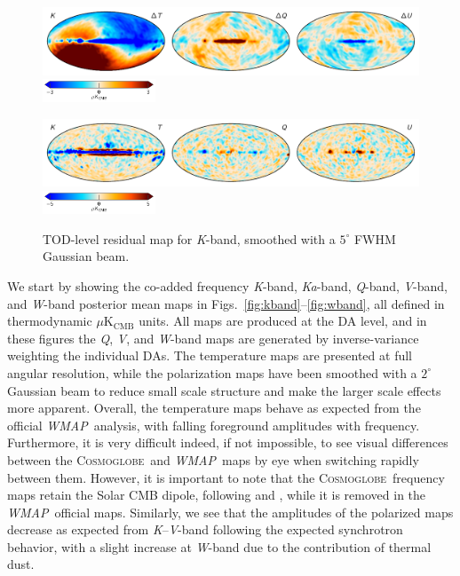 \documentclass[twocolumn]{../../common/aa}
\def\WMAP{\emph{WMAP}}
\def\WMAPnine{\emph{WMAP9}}
\newcommand{\cosmoglobe}{\textsc{Cosmoglobe}}
\newcommand{\K}[0]{\textit K}
\newcommand{\Ka}[0]{\textit{Ka}}
\newcommand{\Q}[0]{\textit Q}
\newcommand{\V}[0]{\textit V}
\newcommand{\W}[0]{\textit W}
\begin{document}
\begin{figure}[t]
	\centering
	\includegraphics[width=\textwidth]{figures/023-WMAP_K_sampdiff.pdf}\\
	\includegraphics[width=0.30\textwidth]{figures/cbar_3uK.pdf}        
	\caption{Difference between two \K-band Gibbs samples, smoothed to $7^\circ$.}
        \label{fig:Ksampdiff}

	\centering
	\includegraphics[width=\textwidth]{figures/tod_res_K_IQU.pdf}\\
	\includegraphics[width=0.30\textwidth]{figures/cbar_5uK.pdf}
	\caption{TOD-level residual map for \K-band, smoothed with a $5^\circ$ FWHM Gaussian beam.}
        \label{fig:todres_K}
\end{figure}

We start by showing the co-added frequency \K-band, \Ka-band, \Q-band, \V-band, and \W-band posterior mean maps in Figs.~\ref{fig:kband}--\ref{fig:wband}, all defined in thermodynamic  $\mu\mathrm{K_{CMB}}$ units. All maps are produced at the DA level, and in these figures the \Q, \V, and \W-band maps are generated by inverse-variance weighting the individual DAs. The temperature maps are presented at full angular resolution, while the polarization maps have been smoothed with a $2^\circ$ Gaussian beam to reduce small scale structure and make the larger scale effects more apparent. Overall, the temperature maps behave as expected from the official \WMAP\ analysis, with falling foreground amplitudes with frequency. Furthermore, it is very difficult indeed, if not impossible, to see visual differences between the \cosmoglobe\ and \WMAP\ maps by eye when switching rapidly between them. However, it is important to note that the \cosmoglobe\ frequency maps retain the Solar CMB dipole, following \citet{npipe} and \citet{bp01}, while it is removed in the \WMAP\ official maps. Similarly, we see that the amplitudes of the polarized maps decrease as expected from \K--\V-band following the expected synchrotron behavior, with a slight increase at \W-band due to the contribution of thermal dust. %
\end{document}
